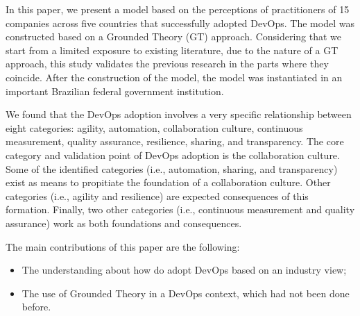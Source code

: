 In this paper, we present a model based on the perceptions of practitioners of 15 companies across five countries that successfully adopted DevOps. The model was constructed based on a Grounded Theory (GT) approach. Considering that we start from a limited exposure to existing literature, due to the nature of a GT approach, this study validates the previous research in the parts where they coincide. %
After the construction of the model, the model was instantiated in an important Brazilian federal government institution. 


We found that the DevOps adoption involves a very specific relationship between eight categories: agility, automation, collaboration culture, continuous measurement, quality assurance, resilience, sharing, and transparency. The core category and validation point  of DevOps adoption is the collaboration culture. Some of the identified categories (i.e., automation, sharing, and transparency) exist as means to propitiate the foundation of a collaboration culture. Other categories (i.e., agility and resilience) are expected consequences of this formation. Finally, two other categories (i.e., continuous measurement and quality assurance) work as both foundations and consequences. 

The main contributions of this paper are the following:

\begin{itemize}
\item The understanding about how do adopt DevOps based on an industry view;
\item The use of Grounded Theory in a DevOps context, which had not been done before.
\end{itemize}


